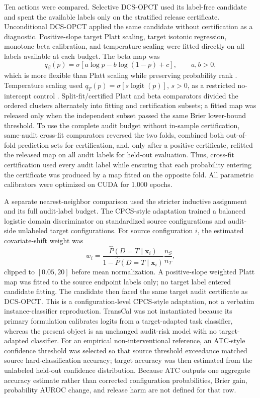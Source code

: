 \documentclass[preprint,12pt]{elsarticle}
\begin{document}
Ten actions were compared. Selective DCS-OPCT used its label-free candidate and spent the available labels only on the stratified release certificate. Unconditional DCS-OPCT applied the same candidate without certification as a diagnostic. Positive-slope target Platt scaling, target isotonic regression, monotone beta calibration, and temperature scaling were fitted directly on all labels available at each budget. The beta map was
\begin{equation}
q_{\beta}(p)=\sigma\!\left[a\log p-b\log(1-p)+c\right],\qquad a,b>0,
\end{equation}
which is more flexible than Platt scaling while preserving probability rank \citep{kull2017beta}. Temperature scaling used $q_T(p)=\sigma[s\operatorname{logit}(p)]$, $s>0$, as a restricted no-intercept control \citep{guo2017calibration}. Split-fit/certified Platt and beta comparators divided the ordered clusters alternately into fitting and certification subsets; a fitted map was released only when the independent subset passed the same Brier lower-bound threshold. To use the complete audit budget without in-sample certification, same-audit cross-fit comparators reversed the two folds, combined both out-of-fold prediction sets for certification, and, only after a positive certificate, refitted the released map on all audit labels for held-out evaluation. Thus, cross-fit certification used every audit label while ensuring that each probability entering the certificate was produced by a map fitted on the opposite fold. All parametric calibrators were optimized on CUDA for 1,000 epochs.

A separate nearest-neighbor comparison used the stricter inductive assignment and its full audit-label budget. The CPCS-style adaptation trained a balanced logistic domain discriminator on standardized source configurations and audit-side unlabeled target configurations. For source configuration $i$, the estimated covariate-shift weight was
\begin{equation}
w_i=\frac{\widehat P(D=T\mid\mathbf{x}_i)}{1-\widehat P(D=T\mid\mathbf{x}_i)}\frac{n_S}{n_T},
\end{equation}
clipped to $[0.05,20]$ before mean normalization. A positive-slope weighted Platt map was fitted to the source endpoint labels only; no target label entered candidate fitting. The candidate then faced the same target audit certificate as DCS-OPCT. This is a configuration-level CPCS-style adaptation, not a verbatim instance-classifier reproduction. TransCal was not instantiated because its primary formulation calibrates logits from a target-adapted task classifier, whereas the present object is an unchanged audit-risk model with no target-adapted classifier. For an empirical non-interventional reference, an ATC-style confidence threshold was selected so that source threshold exceedance matched source hard-classification accuracy; target accuracy was then estimated from the unlabeled held-out confidence distribution. Because ATC outputs one aggregate accuracy estimate rather than corrected configuration probabilities, Brier gain, probability AUROC change, and release harm are not defined for that row.
\end{document}
